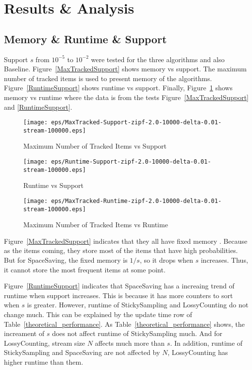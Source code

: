 \documentclass[10pt]{article}
\begin{document}
\section{Results \& Analysis} \label{resultsanalysis}

\subsection{Memory \& Runtime \& Support}
Support $s$ from $10^{-5}$ to $10^{-2}$ were tested for the three algorithms and also Baseline.
Figure~\ref{MaxTrackedSupport} shows memory vs support. 
The maximum number of tracked items is used to present memory of the algorithms.
Figure~\ref{RuntimeSupport} shows runtime vs support.
Finally, Figure~\ref{MaxTrackedRuntime} shows memory vs runtime 
where the data is from the tests Figure~\ref{MaxTrackedSupport} and \ref{RuntimeSupport}.

\begin{figure}[H]
      \begin{minipage}{0.48\textwidth}
        \centering
        \texttt{[image: eps/MaxTracked-Support-zipf-2.0-10000-delta-0.01-stream-100000.eps]}
        \caption{Maximum Number of Tracked Items vs Support}
        \label{MaxTrackedSupport}
      \end{minipage}\hfill
      \begin{minipage}{0.48\textwidth}
        \centering
        \texttt{[image: eps/Runtime-Support-zipf-2.0-10000-delta-0.01-stream-100000.eps]}
        \caption{Runtime vs Support}
        \label{RuntimeSupport}
      \end{minipage}
      \centering
      \begin{minipage}{0.48\textwidth}
        \centering
        \texttt{[image: eps/MaxTracked-Runtime-zipf-2.0-10000-delta-0.01-stream-100000.eps]}
        \caption{Maximum Number of Tracked Items vs Runtime}
        \label{MaxTrackedRuntime}
      \end{minipage}
\end{figure}
 Figure~\ref{MaxTrackedSupport} indicates that they all have fixed memory .
 Because as the items coming, they store most of the items that have high probabilities.
But for SpaceSaving, the fixed memory is $1/s$, so it drops when $s$ increases. 
Thus, it cannot store the most frequent items at some point. 

Figure~\ref{RuntimeSupport} indicates that SpaceSaving has a increaing trend of runtime when
support increases. This is because it has more counters to sort when $s$ is greater.
However, runtime of StickySampling and LossyCounting do not change much.
This can be explained by the update time row of Table~\ref{theoretical_performance}.
As Table~\ref{theoretical_performance} shows, the increament of $s$ does not 
affect runtime of StickySampling much. And for LossyCounting, stream size $N$
affects much more than $s$. In addition, runtime of StickySampling and SpaceSaving are not affected by $N$, 
LossyCounting has higher runtime than them.
\end{document}
